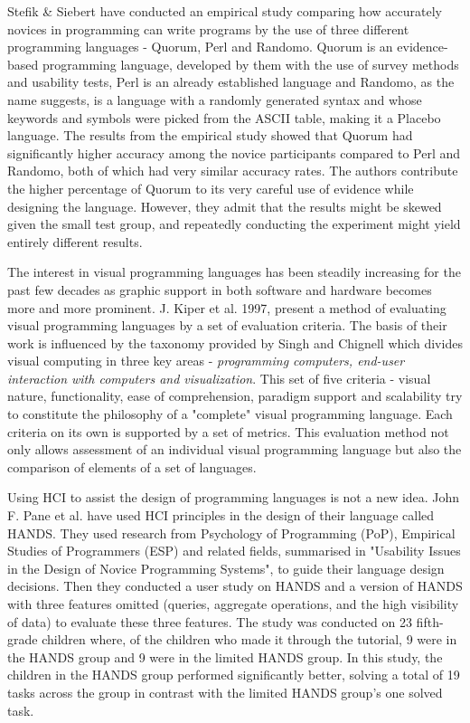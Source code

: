 Stefik \& Siebert \cite{QuorumRandomo} have conducted an empirical study comparing how accurately novices in programming can write programs by the use of three different programming languages - Quorum, Perl and Randomo. Quorum is an evidence-based programming language, developed by them with the use of survey methods and usability tests, Perl is an already established language and Randomo, as the name suggests, is a language with a randomly generated syntax and whose keywords and symbols were picked from the ASCII table, making it a Placebo language. The results from the empirical study showed that Quorum had significantly higher accuracy among the novice participants compared to Perl and Randomo, both of which had very similar accuracy rates. The authors contribute the higher percentage of Quorum to its very careful use of evidence while designing the language. However, they admit that the results might be skewed given the small test group, and repeatedly conducting the experiment might yield entirely different results.

The interest in visual programming languages has been steadily increasing for the past few decades as graphic support in both software and hardware becomes more and more prominent. J. Kiper et al. \cite{VisualLangsEval} 1997, present a method of evaluating visual programming languages by a set of evaluation criteria. The basis of their work is influenced by the taxonomy provided by Singh and Chignell \cite{VisualComputer} which divides visual computing in three key areas - \textit{programming computers, end-user interaction with computers and visualization}. This set of five criteria - visual nature, functionality, ease of comprehension, paradigm support and scalability try to constitute the philosophy of a "complete" visual programming language. Each criteria on its own is supported by a set of metrics. This evaluation method not only allows assessment of an individual visual programming language but also the comparison of elements of a set of languages.

Using HCI to assist the design of programming languages is not a new idea.
John F. Pane et al. \cite{HANDS} have used HCI principles in the design of their language called HANDS.
They used research from Psychology of Programming (PoP), Empirical Studies of Programmers (ESP) and related fields, summarised in "Usability Issues in the Design of Novice Programming Systems"\cite{UsabilityNoviceProgramming}, to guide their language design decisions.
Then they conducted a user study on HANDS and a version of HANDS with three features omitted (queries, aggregate operations, and the high visibility of data) to evaluate these three features.
The study was conducted on 23 fifth-grade children where, of the children who made it through the tutorial, 9 were in the HANDS group and 9 were in the limited HANDS group.
In this study, the children in the HANDS group performed significantly better, solving a total of 19 tasks across the group in contrast with the limited HANDS group's one solved task.

